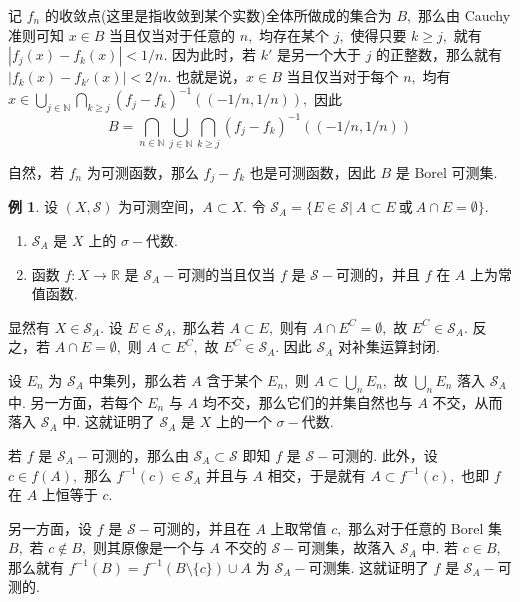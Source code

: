 \documentclass[12pt, a4paper, oneside]{book}
\numberwithin{figure}{section}
\theoremstyle{definition}
\newtheorem{example}[theorem]{例}
\begin{document}
记 $f_n$ 的收敛点(这里是指收敛到某个实数)全体所做成的集合为 $B,$ 那么由 Cauchy 准则可知 $x\in B$ 当且仅当对于任意的 $n,$ 均存在某个 $j,$ 使得只要 $k\geq j,$ 就有 $|f_j(x)-f_k(x)|<1/n.$ 因为此时，若 $k'$ 是另一个大于 $j$ 的正整数，那么就有 $|f_k(x)-f_{k'}(x)|<2/n.$
也就是说，$x\in B$ 当且仅当对于每个 $n,$ 均有 $x\in \bigcup_{j\in\mathbb N}\bigcap_{k\geq j} (f_j-f_k)^{-1}((-1/n,1/n)),$ 因此
\begin{equation}
    B=\bigcap_{n\in\mathbb N}\bigcup_{j\in\mathbb N}\bigcap_{k\geq j} (f_j-f_k)^{-1}((-1/n,1/n))
\end{equation}

自然，若 $f_n$ 为可测函数，那么 $f_j-f_k$ 也是可测函数，因此 $B$ 是 Borel 可测集. 

\begin{example}\label{ex:sigma_algebra_frozen_restriction}
    设 $(X,\mathcal S)$ 为可测空间，$A\subset X.$ 令 $\mathcal S_A=\{E\in\mathcal S|\ A\subset E\ \text{或}\ A\cap E=\emptyset\}.$
    \begin{enumerate}[label=\alph*)]
        \item $\mathcal S_A$ 是 $X$ 上的 $\sigma-$代数.
        \item 函数 $f:X\to \mathbb R$ 是 $\mathcal S_A-$可测的当且仅当 $f$ 是 $\mathcal S-$可测的，并且 $f$ 在 $A$ 上为常值函数.
    \end{enumerate}
\end{example}

显然有 $X\in \mathcal S_A.$ 设 $E\in \mathcal S_A,$ 那么若 $A\subset E,$ 则有 $A\cap E^C=\emptyset,$ 故 $E^C\in\mathcal S_A.$ 反之，若 $A\cap E=\emptyset,$ 则 $A\subset E^C,$ 故 $E^C\in\mathcal S_A.$ 
因此 $\mathcal S_A$ 对补集运算封闭.

设 $E_n$ 为 $\mathcal S_A$ 中集列，那么若 $A$ 含于某个 $E_n,$ 则 $A\subset\bigcup_n E_n,$ 故 $\bigcup_n E_n$ 落入 $\mathcal S_A$ 中. 另一方面，若每个 $E_n$ 与 $A$ 均不交，那么它们的并集自然也与 $A$ 不交，从而落入 $\mathcal S_A$ 中. 
这就证明了 $\mathcal S_A$ 是 $X$ 上的一个 $\sigma-$代数. 

若 $f$ 是 $\mathcal S_A-$可测的，那么由 $\mathcal S_A\subset\mathcal S$ 即知 $f$ 是 $\mathcal S-$可测的. 此外，设 $c\in f(A),$ 那么 $f^{-1}(c)\in\mathcal S_A$ 并且与 $A$ 相交，于是就有 $A\subset f^{-1}(c),$ 也即 $f$ 在 $A$ 上恒等于 $c.$ 

另一方面，设 $f$ 是 $\mathcal S-$可测的，并且在 $A$ 上取常值 $c,$ 那么对于任意的 Borel 集 $B,$ 若 $c\notin B,$ 则其原像是一个与 $A$ 不交的 $\mathcal S-$可测集，故落入 $\mathcal S_A$ 中.
若 $c\in B,$ 那么就有 $f^{-1}(B)=f^{-1}(B\setminus\{c\})\cup A$ 为 $\mathcal S_A-$可测集. 这就证明了 $f$ 是 $\mathcal S_A-$可测的.
\end{document}
